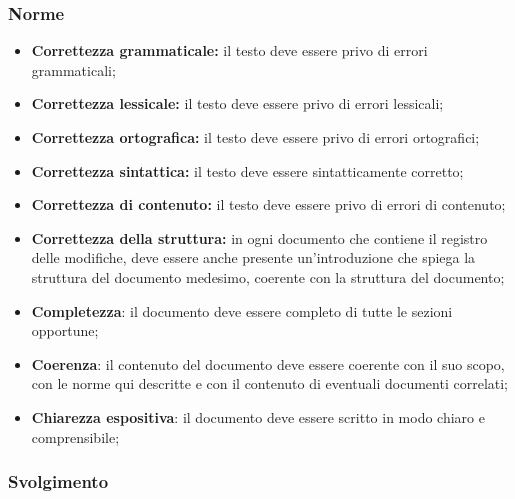 \subsubsection{Norme}
\begin{itemize}
	\item \textbf{Correttezza grammaticale:} il testo deve essere privo di
	      errori grammaticali;

	\item \textbf{Correttezza lessicale:} il testo deve essere privo di errori
	      lessicali;

	\item \textbf{Correttezza ortografica:} il testo deve essere privo di errori
	      ortografici;

	\item \textbf{Correttezza sintattica:} il testo deve essere sintatticamente
	      corretto;

	\item \textbf{Correttezza di contenuto:} il testo deve essere privo di
	      errori di contenuto;

	\item \textbf{Correttezza della struttura:} in ogni documento che contiene
	      il registro delle modifiche, deve essere anche presente
	      un'introduzione che spiega la struttura del documento medesimo,
	      coerente con la struttura del documento;

	\item \textbf{Completezza}: il documento deve essere completo di tutte le
	      sezioni opportune;

	\item \textbf{Coerenza}: il contenuto del documento deve essere
	      coerente con il suo scopo, con le norme qui descritte e con il
	      contenuto di eventuali documenti correlati;

	\item \textbf{Chiarezza espositiva}: il documento deve essere
	      scritto in modo chiaro e comprensibile;
\end{itemize}

\subsubsection{Svolgimento}

